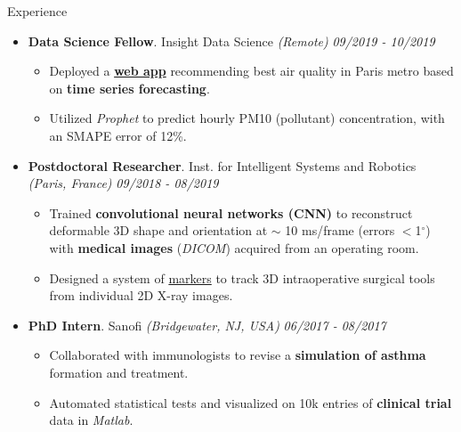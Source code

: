 \documentclass{resume} %
\begin{document}
\begin{rSection}{Experience}
\begin{itemize}[leftmargin=0em]
			\item {\bf Data Science Fellow}{. Insight Data Science \textit{(Remote)}} \hfill {\em 09/2019 - 10/2019}\\
			\vspace{-5mm}
			\begin{itemize}
				\setlength\itemsep{-1.75em}
				\item Deployed a \textbf{\href{https://aety.github.io/my-first-web-app}{web app}} recommending best air quality in Paris metro based on \textbf{time series forecasting}.\\
				\item Utilized \textit{Prophet} to predict hourly PM10 (pollutant) concentration, with an SMAPE error of 12\%.
			\end{itemize}	
			
			\item {\bf Postdoctoral Researcher}{. Inst. for Intelligent Systems and Robotics \textit{(Paris, France)}} \hfill {\em 09/2018 - 08/2019}\\
			\vspace{-5mm}
			\begin{itemize}
				\setlength\itemsep{-1.75em}
				\item  Trained \textbf{convolutional neural networks (CNN)} to reconstruct deformable 3D shape and orientation at $\sim$ 10 ms/frame (errors $<$1$^\circ$) with \textbf{medical images} (\textit{DICOM}) acquired from an operating room.\\
				\item  Designed a system of \href{https://aety.github.io/active-catheter-tracking/}{markers} to track 3D intraoperative surgical tools from individual 2D X-ray images.
			\end{itemize}
			
			\item {\bf PhD Intern}{. Sanofi \textit{(Bridgewater, NJ, USA)}} \hfill {\em 06/2017 - 08/2017}\\
			\vspace{-5mm}
			\begin{itemize}
				\setlength\itemsep{-1.75em}	
				\item Collaborated with immunologists to revise a \textbf{simulation of asthma} formation and treatment.\\
				\item Automated statistical tests and visualized on 10k entries of \textbf{clinical trial} data in \textit{Matlab}.
			\end{itemize}
			

\end{itemize}
\end{rSection}
\end{document}
